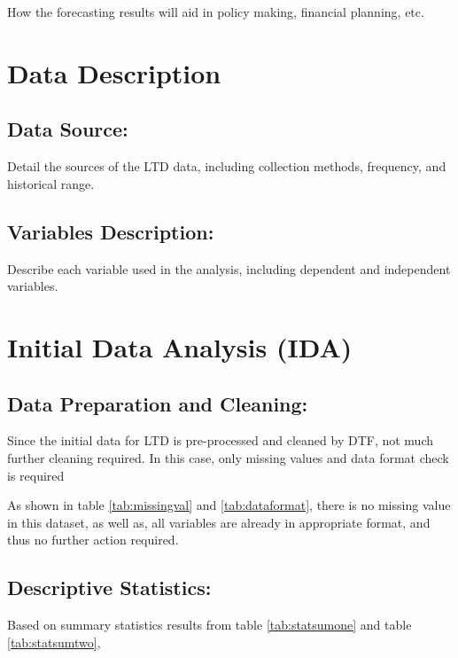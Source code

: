 \documentclass[11pt,a4paper,]{article}
\begin{document}
How the forecasting results will aid in policy making, financial planning, etc.

\section{Data Description}\label{data-description}

\subsection{Data Source:}\label{data-source}

Detail the sources of the LTD data, including collection methods, frequency, and historical range.

\subsection{Variables Description:}\label{variables-description}

Describe each variable used in the analysis, including dependent and independent variables.

\section{Initial Data Analysis (IDA)}\label{initial-data-analysis-ida}

\subsection{Data Preparation and Cleaning:}\label{data-preparation-and-cleaning}

Since the initial data for LTD is pre-processed and cleaned by DTF, not much further cleaning required. In this case, only missing values and data format check is required

As shown in table \ref{tab:missingval} and \ref{tab:dataformat}, there is no missing value in this dataset, as well as, all variables are already in appropriate format, and thus no further action required.

\subsection{Descriptive Statistics:}\label{descriptive-statistics}

Based on summary statistics results from table \ref{tab:statsumone} and table \ref{tab:statsumtwo},
\end{document}

